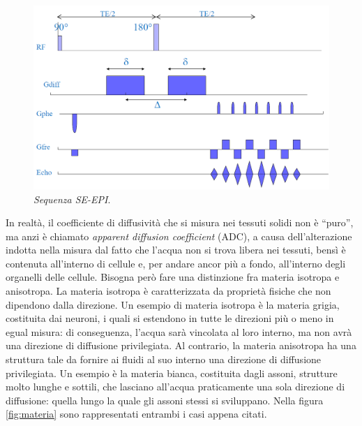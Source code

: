 \documentclass{report}
\newcommand{\virgolette}[1]{``#1''}
\newcommand{\figref}[1]{figura \ref{#1}}
\numberwithin{equation}{section}
\numberwithin{figure}{section}
\begin{document}
\begin{figure}[htp]
\centering
\includegraphics[scale=0.55]{immagini/seepi.png}
\caption{\label{fig:seepi} \textit{Sequenza SE-EPI}.}
\end{figure}

In realtà, il coefficiente di diffusività che si misura nei tessuti solidi non è \virgolette{puro}, ma anzi è chiamato \textit{apparent diffusion coefficient} (ADC), a causa dell'alterazione indotta nella misura dal fatto che l'acqua non si trova libera nei tessuti, bensì è contenuta all'interno di cellule e, per andare ancor più a fondo, all'interno degli organelli delle cellule. Bisogna però fare una distinzione fra materia isotropa e anisotropa. La materia isotropa è caratterizzata da proprietà fisiche che non dipendono dalla direzione. Un esempio di materia isotropa è la materia grigia, costituita dai neuroni, i quali si estendono in tutte le direzioni più o meno in egual misura: di conseguenza, l'acqua sarà vincolata al loro interno, ma non avrà una direzione di diffusione privilegiata. Al contrario, la materia anisotropa ha una struttura tale da fornire ai fluidi al suo interno una direzione di diffusione privilegiata. Un esempio è la materia bianca, costituita dagli assoni, strutture molto lunghe e sottili, che lasciano all'acqua praticamente una sola direzione di diffusione: quella lungo la quale gli assoni stessi si sviluppano. Nella \figref{fig:materia} sono rappresentati entrambi i casi appena citati.
\end{document}

